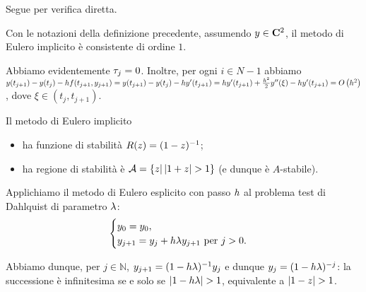 \Proof Segue per verifica diretta. \EndProof
\begin{Theorem}
	Con le notazioni della definizione precedente, assumendo $y \in \CClass{2}$, il metodo di Eulero implicito \`e consistente di ordine $1$.
\end{Theorem}
\Proof Abbiamo evidentemente $\tau_j = 0$. Inoltre, per ogni $i \in N - 1$ abbiamo $y(t_{j + 1}) - y(t_j) - h f(t_{j + 1},y_{j + 1}) = y(t_{j + 1}) - y(t_j) - h y'(t_{j + 1}) = h y'(t_{j + 1}) + \frac{h^2}{2} y''(\xi) - h y'(t_{j + 1}) = O \left ( h^2 \right )$, dove $\xi \in (t_j,t_{j + 1})$. \EndProof
\begin{Theorem}
	Il metodo di Eulero implicito
	\begin{itemize}
		\item ha funzione di stabilit\`a $R(z) = (1 - z)^{-1}$;
		\item ha regione di stabilit\`a \`e $\mathcal{A} = \lbrace z | \left \lvert 1 + z \right \rvert > 1 \rbrace$ (e dunque \`e $A$-stabile).
	\end{itemize}
\end{Theorem}
\Proof Applichiamo il metodo di Eulero esplicito con passo $h$ al problema test di Dahlquist di parametro $\lambda$: 
\[
\begin{cases}
	y_0 = y_0,\\
	y_{j + 1} = y_j + h \lambda y_{j + 1}\text{ per }j > 0.
\end{cases}
\]
\par Abbiamo dunque, per $j \in \mathbb{N}$, $y_{j + 1} = (1 - h \lambda)^{-1}y_j$ e dunque $y_j = (1 - h \lambda)^{-j}$: la successione \`e infinitesima se e solo se $\left \lvert 1 - h \lambda \right \rvert > 1$, equivalente a $\left \lvert 1 - z \right \rvert > 1$. \EndProof
